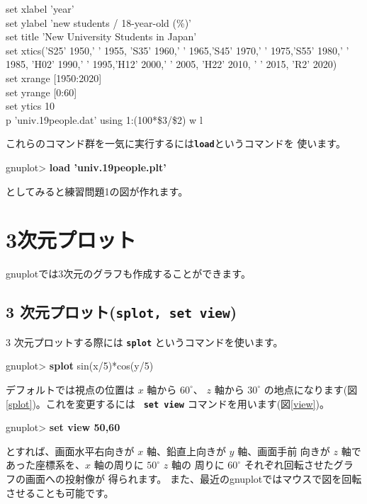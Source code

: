 \documentclass[a4j]{ujarticle} %
\newenvironment{terminal}{%
  \begin{center}
   \begin{minipage}{.8\textwidth}
    \setlength{\FrameSep}{.5\FrameSep}%
    \begin{framed}\ttfamily\small%
     \setlength\baselineskip{.85\baselineskip}%
}{%
    \end{framed}
   \end{minipage}
  \end{center}%
}
\begin{document}
\begin{terminal}
 set xlabel 'year'\\
 set ylabel 'new students / 18-year-old (\%)'\\
 set title 'New University Students in Japan'\\
 set xtics('S25' 1950,' ' 1955, 'S35' 1960,' ' 1965,'S45' 1970,' ' 1975,'S55' 1980,' ' 1985, 'H02' 1990,' ' 1995,'H12' 2000,' ' 2005, 'H22' 2010, ' ' 2015, 'R2' 2020)\\
 set xrange [1950:2020]\\
 set yrange [0:60]\\
 set ytics 10\\
 p 'univ.19people.dat' using 1:(100*\$3/\$2) w l
\end{terminal}

これらのコマンド群を一気に実行するには{\tt\bf load}というコマンドを
使います。

\begin{terminal}
gnuplot> {\bf load 'univ.19people.plt'}
\end{terminal}

としてみると練習問題1の図が作れます。

\section{3次元プロット}
gnuplotでは3次元のグラフも作成することができます。
\subsection{3 次元プロット({\tt\bf splot, set view})}
3 次元プロットする際には {\tt\bf splot} というコマンドを使います。
\begin{terminal}
gnuplot> {\bf splot} sin(x/5)*cos(y/5)
\end{terminal}
デフォルトでは視点の位置は $x$ 軸から $60^{\circ}$、 $z$ 軸から 
$30^{\circ}$ の地点になります(図\ref{splot})。これを変更するには {\tt\bf
set view} コマンドを用います(図\ref{view})。
\begin{terminal}
gnuplot> {\bf set view 50,60}
\end{terminal}
とすれば、画面水平右向きが $x$ 軸、鉛直上向きが $y$ 軸、画面手前
向きが $z$ 軸であった座標系を、$x$ 軸の周りに $50^{\circ}$ $z$ 軸の
周りに $60^{\circ}$ それぞれ回転させたグラフの画面への投射像が
得られます。
また、最近のgnuplotではマウスで図を回転させることも可能です。
\end{document}
